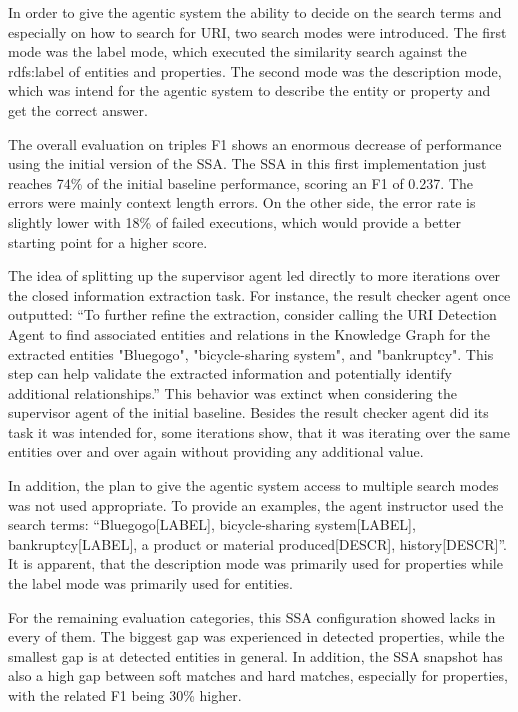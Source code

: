 \documentclass[a4paper,oneside,bibliography=totoc]{scrbook}
\begin{document}
In order to give the agentic system the ability to decide on the search terms and especially on how to search for URI, two search modes were introduced. The first mode was the label mode, which executed the similarity search against the rdfs:label of entities and properties. The second mode was the description mode, which was intend for the agentic system to describe the entity or property and get the correct answer.

The overall evaluation on triples F1 shows an enormous decrease of performance using the initial version of the \ac{SSA}. The \ac{SSA} in this first implementation just reaches 74\% of the initial baseline performance, scoring an F1 of 0.237. The errors were mainly context length errors. On the other side, the error rate is slightly lower with 18\% of failed executions, which would provide a better starting point for a higher score.

The idea of splitting up the supervisor agent led directly to more iterations over the closed information extraction task. For instance, the result checker agent once outputted: \enquote{To further refine the extraction, consider calling the URI Detection Agent to find associated entities and relations in the Knowledge Graph for the extracted entities "Bluegogo", "bicycle-sharing system", and "bankruptcy". This step can help validate the extracted information and potentially identify additional relationships.} This behavior was extinct when considering the supervisor agent of the initial baseline. Besides the result checker agent did its task it was intended for, some iterations show, that it was iterating over the same entities over and over again without providing any additional value.

In addition, the plan to give the agentic system access to multiple search modes was not used appropriate. To provide an examples, the agent instructor used the search terms: \enquote{Bluegogo[LABEL], bicycle-sharing system[LABEL], bankruptcy[LABEL], a product or material produced[DESCR], history[DESCR]}. It is apparent, that the description mode was primarily used for properties while the label mode was primarily used for entities.

For the remaining evaluation categories, this \ac{SSA} configuration showed lacks in every of them. The biggest gap was experienced in detected properties, while the smallest gap is at detected entities in general. In addition, the \ac{SSA} snapshot has also a high gap between soft matches and hard matches, especially for properties, with the related F1 being 30\% higher.
\end{document}
